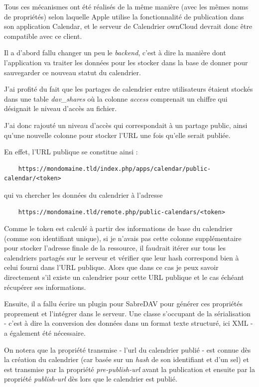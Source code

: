 \documentclass[10pt,a4paper, twoside]{report}
\begin{document}
	Tous ces mécanismes ont été réalisés de la même manière (avec les mêmes noms de propriétés) selon laquelle Apple utilise la fonctionnalité de publication dans son application Calendar, et le serveur de Calendrier ownCloud devrait donc être compatible avec ce client.
	
	Il a d'abord fallu changer un peu le \textit{backend}, c'est à dire la manière dont l'application va traiter les données pour les stocker dans la base de donner pour sauvegarder ce nouveau statut du calendrier.
	
	J'ai profité du fait que les partages de calendrier entre utilisateurs étaient stockés dans une table \textit{dav\_shares} où la colonne \textit{access} comprenait un chiffre qui désignait le niveau d'accès au fichier.
	
	J'ai donc rajouté un niveau d'accès qui correspondait à un partage public, ainsi qu'une nouvelle colonne pour stocker l'URL une fois qu'elle serait publiée. 
	
	En effet, l'URL publique se constitue ainsi : 
	\begin{verbatim}
	https://mondomaine.tld/index.php/apps/calendar/public-calendar/<token>
	\end{verbatim}
	qui va chercher les données du calendrier à l'adresse
	\begin{verbatim}
	https://mondomaine.tld/remote.php/public-calendars/<token>
	\end{verbatim}
	
	Comme le token est calculé à partir des informations de base du calendrier (comme son identifiant unique), si je n'avais pas cette colonne supplémentaire pour stocker l'adresse finale de la ressource, il faudrait itérer sur tous les calendriers partagés sur le serveur et vérifier que leur hash correspond bien à celui fourni dans l'URL publique. Alors que dans ce cas je peux savoir directement s'il existe un calendrier pour cette URL publique et le cas échéant récupérer ses informations.
	
	Ensuite, il a fallu écrire un plugin pour SabreDAV pour générer ces propriétés proprement et l'intégrer dans le serveur. Une classe s'occupant de la sérialisation - c'est à dire la conversion des données dans un format texte structuré, ici XML - a également été nécessaire.
	
	On notera que la propriété transmise - l'url du calendrier publié - est connue dès la création du calendrier (car basée sur un \textit{hash} de son identifiant et d'un sel) et est transmise par la propriété \textit{pre-publish-url} avant la publication et ensuite par la propriété \textit{publish-url} dès lors que le calendrier est publié.
	
\end{document}

